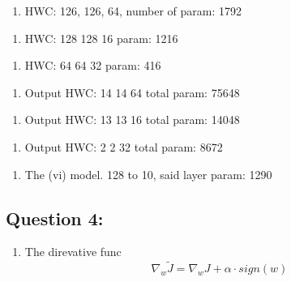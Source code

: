 \documentclass[11pt]{article}
\providecommand{\tightlist}{%
      \setlength{\itemsep}{0pt}\setlength{\parskip}{0pt}}
\begin{document}
    \begin{enumerate}
\def\labelenumi{(\roman{enumi})}
\tightlist
\item
  HWC: 126, 126, 64, number of param: 1792
\end{enumerate}

    \begin{enumerate}
\def\labelenumi{(\roman{enumi})}
\setcounter{enumi}{1}
\tightlist
\item
  HWC: 128 128 16 param: 1216
\end{enumerate}

    \begin{enumerate}
\def\labelenumi{(\roman{enumi})}
\setcounter{enumi}{2}
\tightlist
\item
  HWC: 64 64 32 param: 416
\end{enumerate}

    \begin{enumerate}
\def\labelenumi{(\roman{enumi})}
\setcounter{enumi}{3}
\tightlist
\item
  Output HWC: 14 14 64 total param: 75648
\end{enumerate}

    \begin{enumerate}
\def\labelenumi{(\alph{enumi})}
\setcounter{enumi}{21}
\tightlist
\item
  Output HWC: 13 13 16 total param: 14048
\end{enumerate}

    \begin{enumerate}
\def\labelenumi{(\roman{enumi})}
\setcounter{enumi}{5}
\tightlist
\item
  Output HWC: 2 2 32 total param: 8672
\end{enumerate}

    \begin{enumerate}
\def\labelenumi{(\roman{enumi})}
\setcounter{enumi}{6}
\tightlist
\item
  The (vi) model. 128 to 10, said layer param: 1290
\end{enumerate}

    \hypertarget{question-4}{%
\subsection{Question 4:}\label{question-4}}

    \begin{enumerate}
\def\labelenumi{(\roman{enumi})}
\tightlist
\item
  The direvative func \begin{equation}
  \nabla_w \widetilde{J} = \nabla_w J + \alpha \cdot sign(w)
  \end{equation}
\end{enumerate}
\end{document}
